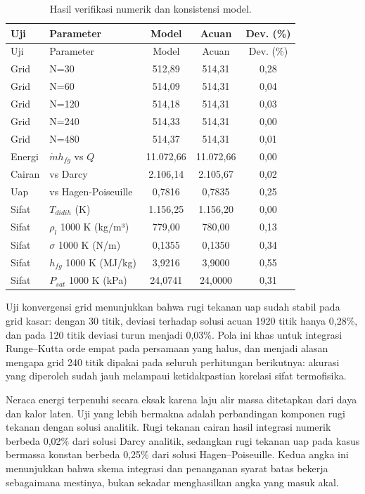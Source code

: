 \documentclass[
  indonesian,
  12pt,
  a4paper,
]{report}
\begin{document}
\begin{longtable}[]{@{}llccc@{}}
\caption{Hasil verifikasi numerik dan konsistensi
model.}\label{tbl-verifikasi}\tabularnewline
\toprule\noalign{}
Uji & Parameter & Model & Acuan & Dev. (\%) \\
\midrule\noalign{}
\endfirsthead
\toprule\noalign{}
Uji & Parameter & Model & Acuan & Dev. (\%) \\
\midrule\noalign{}
\endhead
\bottomrule\noalign{}
\endlastfoot
Grid & N=30 & 512,89 & 514,31 & 0,28 \\
Grid & N=60 & 514,09 & 514,31 & 0,04 \\
Grid & N=120 & 514,18 & 514,31 & 0,03 \\
Grid & N=240 & 514,33 & 514,31 & 0,00 \\
Grid & N=480 & 514,37 & 514,31 & 0,01 \\
Energi & \(\dot m h_{fg}\) vs \(Q\) & 11.072,66 & 11.072,66 & 0,00 \\
Cairan & vs Darcy & 2.106,14 & 2.105,67 & 0,02 \\
Uap & vs Hagen-Poiseuille & 0,7816 & 0,7835 & 0,25 \\
Sifat & \(T_{didih}\) (K) & 1.156,25 & 1.156,20 & 0,00 \\
Sifat & \(\rho_l\) 1000 K (kg/m³) & 779,00 & 780,00 & 0,13 \\
Sifat & \(\sigma\) 1000 K (N/m) & 0,1355 & 0,1350 & 0,34 \\
Sifat & \(h_{fg}\) 1000 K (MJ/kg) & 3,9216 & 3,9000 & 0,55 \\
Sifat & \(P_{sat}\) 1000 K (kPa) & 24,0741 & 24,0000 & 0,31 \\
\end{longtable}

Uji konvergensi grid menunjukkan bahwa rugi tekanan uap sudah stabil
pada grid kasar: dengan 30 titik, deviasi terhadap solusi acuan 1920
titik hanya 0,28\%, dan pada 120 titik deviasi turun menjadi 0,03\%.
Pola ini khas untuk integrasi Runge--Kutta orde empat pada persamaan
yang halus, dan menjadi alasan mengapa grid 240 titik dipakai pada
seluruh perhitungan berikutnya: akurasi yang diperoleh sudah jauh
melampaui ketidakpastian korelasi sifat termofisika.

Neraca energi terpenuhi secara eksak karena laju alir massa ditetapkan
dari daya dan kalor laten. Uji yang lebih bermakna adalah perbandingan
komponen rugi tekanan dengan solusi analitik. Rugi tekanan cairan hasil
integrasi numerik berbeda 0,02\% dari solusi Darcy analitik, sedangkan
rugi tekanan uap pada kasus bermassa konstan berbeda 0,25\% dari solusi
Hagen--Poiseuille. Kedua angka ini menunjukkan bahwa skema integrasi dan
penanganan syarat batas bekerja sebagaimana mestinya, bukan sekadar
menghasilkan angka yang masuk akal.
\end{document}
